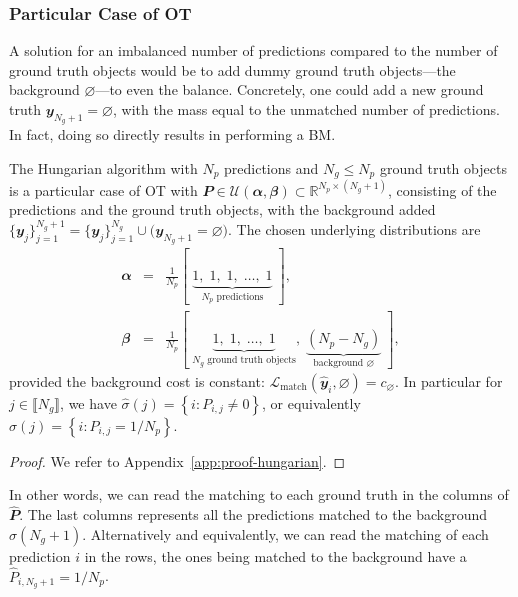 \subsubsection{Particular Case of OT}
A solution for an imbalanced number of predictions compared to the number of ground truth objects would be to add dummy ground truth objects---the background $\varnothing$---to even the balance. Concretely, one could add a new ground truth $\mathbfit{y}_{N_g+1} = \varnothing$, with the mass equal to the unmatched number of predictions. In fact, doing so directly results in performing a BM.

\begin{proposition}
\label{prop:lap}
    The Hungarian algorithm with $N_p$ predictions and $N_g \leq N_p$ ground truth objects is a particular case of OT with $\mathbfit{P} \in \mathcal{U}(\mathbfit{\alpha},\mathbfit{\beta}) \subset \mathbb{R}^{N_p \times (N_g+1)}$, consisting of the predictions and the ground truth objects, with the background added $\{\mathbfit{y}_j\}_{j=1}^{N_g+1} = \{\mathbfit{y}_j\}_{j=1}^{N_g} \cup \big(\mathbfit{y}_{N_g+1}=\varnothing\big)$. The chosen underlying distributions are
    \begin{eqnarray}
        \mathbfit{\alpha} &=& \frac{1}{N_p}[\; \underbrace{1, \; 1, \;1,\; \ldots, \; 1}_{\text{$N_p$ predictions}}\;], \\
        \mathbfit{\beta} &=& \frac{1}{N_p}[\; \underbrace{1, \; 1, \; \ldots, \; 1}_{\text{$N_g$ ground truth objects}}, \; \underbrace{(N_p-N_g)}_{\text{background }\varnothing} \;],
    \end{eqnarray}
    provided the background cost is constant:
    $\mathcal{L}_{\text{match}}\left(\hat{\mathbfit{y}}_i,\varnothing\right) = c_{\varnothing}$. In particular for $j \in \llbracket N_g\rrbracket$, we have $\hat{\sigma}(j) = \left\{ i : P_{i,j} \neq 0 \right\}$, or equivalently $\hat{\sigma}(j) = \left\{ i : P_{i,j} = 1/N_p \right\}$.
\end{proposition}
\begin{proof}
    We refer to Appendix~\ref{app:proof-hungarian}.
\end{proof}

In other words, we can read the matching to each ground truth in the columns of $\hat{\mathbfit{P}}$. The last columns represents all the predictions matched to the background $\hat{\sigma}(N_g+1)$. Alternatively and equivalently, we can read the matching of each prediction $i$ in the rows, the ones being matched to the background have a $\hat{P}_{i,N_g+1} = 1/N_p$.

